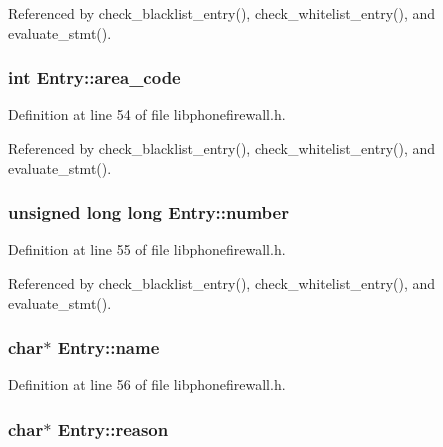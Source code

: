 Referenced by check\_\-blacklist\_\-entry(), check\_\-whitelist\_\-entry(), and evaluate\_\-stmt().\hypertarget{structEntry_9de7b96e5b65796bd35e9dc730dcd8b3}{
\subsubsection{\setlength{\rightskip}{0pt plus 5cm}int {\bf Entry::area\_\-code}}}
\label{structEntry_9de7b96e5b65796bd35e9dc730dcd8b3}




Definition at line 54 of file libphonefirewall.h.

Referenced by check\_\-blacklist\_\-entry(), check\_\-whitelist\_\-entry(), and evaluate\_\-stmt().\hypertarget{structEntry_1f2177afed89936f82c130ae13fb107c}{
\subsubsection{\setlength{\rightskip}{0pt plus 5cm}unsigned long long {\bf Entry::number}}}
\label{structEntry_1f2177afed89936f82c130ae13fb107c}




Definition at line 55 of file libphonefirewall.h.

Referenced by check\_\-blacklist\_\-entry(), check\_\-whitelist\_\-entry(), and evaluate\_\-stmt().\hypertarget{structEntry_272e382d3efed5f970c7939742ec9603}{
\subsubsection{\setlength{\rightskip}{0pt plus 5cm}char$\ast$ {\bf Entry::name}}}
\label{structEntry_272e382d3efed5f970c7939742ec9603}




Definition at line 56 of file libphonefirewall.h.\hypertarget{structEntry_2082cdbb815dfa8b81309cd395d32986}{
\subsubsection{\setlength{\rightskip}{0pt plus 5cm}char$\ast$ {\bf Entry::reason}}}
\label{structEntry_2082cdbb815dfa8b81309cd395d32986}




